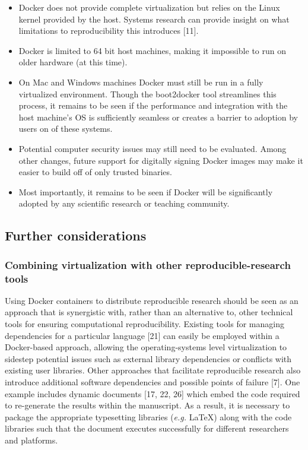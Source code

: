 \documentclass[9pt]{components/acm_proc_article-sp}
\begin{document}
\begin{itemize}
\item
  Docker does not provide complete virtualization but relies on the
  Linux kernel provided by the host. Systems research can provide
  insight on what limitations to reproducibility this introduces
  {[}11{]}.
\item
  Docker is limited to 64 bit host machines, making it impossible to run
  on older hardware (at this time).
\item
  On Mac and Windows machines Docker must still be run in a fully
  virtualized environment. Though the boot2docker tool streamlines this
  process, it remains to be seen if the performance and integration with
  the host machine's OS is sufficiently seamless or creates a barrier to
  adoption by users on of these systems.
\item
  Potential computer security issues may still need to be evaluated.
  Among other changes, future support for digitally signing Docker
  images may make it easier to build off of only trusted binaries.
\item
  Most importantly, it remains to be seen if Docker will be
  significantly adopted by any scientific research or teaching
  community.
\end{itemize}

\subsection{Further considerations}\label{further-considerations}

\subsubsection{Combining virtualization with other reproducible-research
tools}\label{combining-virtualization-with-other-reproducible-research-tools}

Using Docker containers to distribute reproducible research should be
seen as an approach that is synergistic with, rather than an alternative
to, other technical tools for ensuring computational reproducibility.
Existing tools for managing dependencies for a particular language
{[}21{]} can easily be employed within a Docker-based approach, allowing
the operating-systems level virtualization to sidestep potential issues
such as external library dependencies or conflicts with existing user
libraries. Other approaches that facilitate reproducible research also
introduce additional software dependencies and possible points of
failure {[}7{]}. One example includes dynamic documents {[}17, 22, 26{]}
which embed the code required to re-generate the results within the
manuscript. As a result, it is necessary to package the appropriate
typesetting libraries (\emph{e.g.} \LaTeX) along with the code libraries
such that the document executes successfully for different researchers
and platforms.
\end{document}
